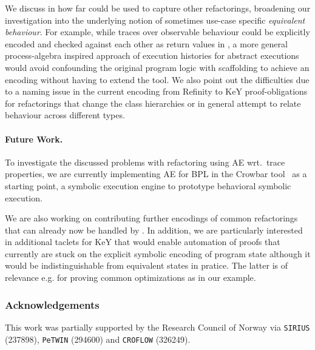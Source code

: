 \documentclass[runningheads]{llncs}
\begin{document}
We discuss in how far \Refinity{} could be used to capture other refactorings, broadening our investigation into the underlying notion of sometimes use-case specific \textit{equivalent behaviour}.
For example, while traces over observable behaviour could be explicitly encoded and checked against each other as return values in \Refinity{}, a more general process-algebra inspired approach of execution histories for abstract executions would avoid confounding the original program logic with scaffolding to achieve an encoding without having to extend the tool.
We also point out the difficulties due to a naming issue in the current encoding from Refinity to KeY proof-obligations for refactorings that change the class hierarchies or in general attempt to relate behaviour across different types.

\paragraph{Future Work.} 
To investigate the discussed problems with refactoring using AE wrt.\ trace properties, we are currently implementing AE for BPL in the Crowbar tool~\cite{crowbar} as a starting point, a symbolic execution engine to prototype behavioral symbolic execution.

We are also working on contributing further encodings of common refactorings that can already now be handled by \Refinity{}.
In addition, we are particularly interested in additional taclets for KeY that would enable automation of proofs
that currently are stuck on the explicit symbolic encoding of program state although it would be indistinguishable from equivalent states in pratice.
The latter is of relevance e.g. for proving common optimizations as in our  example.

\subsubsection*{Acknowledgements}
This work was partially supported by the Research Council of Norway via \texttt{SIRIUS} (237898), \texttt{PeTWIN} (294600) and \texttt{CROFLOW} (326249).
%

% 



\end{document}
